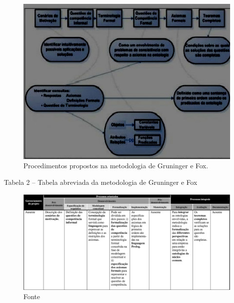 \begin{figure}[h] 
\centering %
\includegraphics[scale=0.65]{Figuras/3.png} %
\caption[Procedimentos propostos na metodologia de Gruninger e Fox]{Procedimentos propostos na metodologia de Gruninger e Fox. %
}
\end{figure}

Tabela 2 – Tabela abreviada da metodologia de Gruninger e Fox

\begin{figure}[h] 
\centering %
\includegraphics[scale=0.3]{Figuras/4.png} %
\caption{Fonte%
}
\end{figure}

